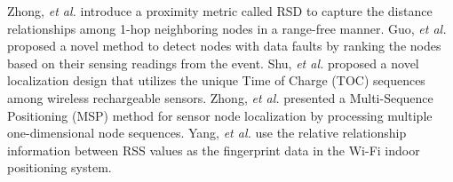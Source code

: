 Zhong, \emph{et al.} \cite{zhong2011rsd} introduce a proximity metric called RSD to capture the distance relationships among 1-hop neighboring nodes in a range-free manner. 
Guo, \emph{et al.} \cite{guo2014detecting}  proposed a novel method to detect nodes with data faults by ranking the nodes based on their sensing
readings from the event.
Shu, \emph{et al.} \cite{shu2015toc}  proposed a novel localization design that utilizes the unique Time of Charge (TOC) sequences among wireless rechargeable sensors.
Zhong, \emph{et al.} \cite{zhong2012wireless} presented a Multi-Sequence Positioning (MSP) method for  sensor node localization by processing multiple one-dimensional node sequences.
Yang, \emph{et al.} \cite{yang2013freeloc} use the relative relationship information between RSS values as the fingerprint data in the Wi-Fi indoor positioning system.




